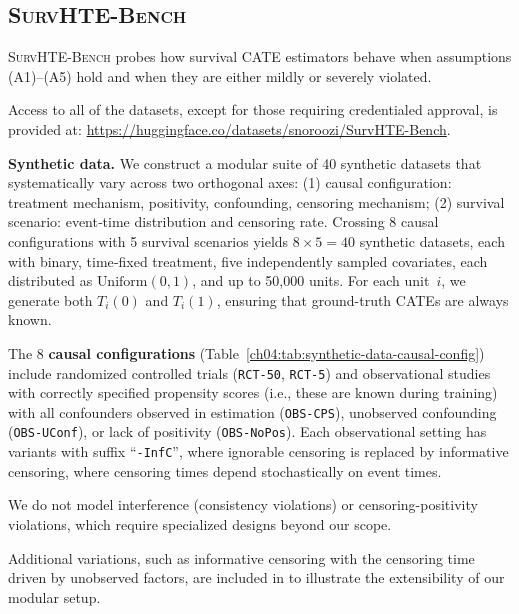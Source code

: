 \subsection{\textsc{SurvHTE-Bench}}
\label{ch04:sec:bench}





\textsc{SurvHTE-Bench} probes how survival CATE estimators behave when assumptions (A1)--(A5) hold and when they are either mildly or severely violated.

Access to all of the datasets, except for those requiring credentialed approval, is provided at: \url{https://huggingface.co/datasets/snoroozi/SurvHTE-Bench}.

\textbf{Synthetic data.}
We construct a modular suite of 40 synthetic datasets that systematically vary across two orthogonal axes: (1) causal configuration: treatment mechanism, positivity, confounding, censoring mechanism; (2) survival scenario: event‑time distribution and censoring rate. 
Crossing 8 causal configurations with 5 survival scenarios yields $8\times5=40$ synthetic datasets, each with binary, time‑fixed treatment, five independently sampled covariates, each distributed as $\text{Uniform}(0,1)$, and up to 50{,}000 units.
For each unit~$i$, we generate both $T_i(0)$ and $T_i(1)$, ensuring that ground-truth CATEs are always known. 


The 8 \textbf{causal configurations} (Table~\ref{ch04:tab:synthetic-data-causal-config}) include randomized controlled trials (\texttt{RCT-50}, \texttt{RCT-5}) and observational studies with correctly specified propensity scores (i.e., these are known during training) with all confounders observed in estimation (\texttt{OBS-CPS}), unobserved confounding (\texttt{OBS-UConf}), or lack of positivity (\texttt{OBS-NoPos}).
Each observational setting has variants with suffix ``\texttt{-InfC}'', where ignorable censoring is replaced by informative censoring, where censoring times depend stochastically on event times.

We do not model interference (consistency violations) or censoring-positivity violations, which require specialized designs beyond our scope.

Additional variations, such as informative censoring with the censoring time driven by unobserved factors, are included in \citet[Appendix I]{noroozizadeh2026survhte} to illustrate the extensibility of our modular setup.

